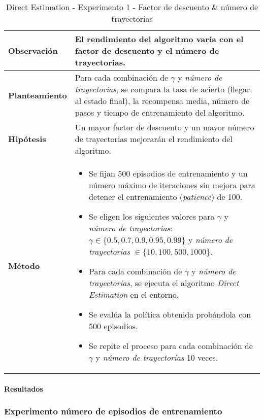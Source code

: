 \begin{table}[H]
    \centering
    \begin{tabularx}{\textwidth}{|p{4cm}|X|} %
        \hline %
        \textbf{Observación} & El rendimiento del algoritmo varía con el factor de descuento y el número de trayectorias.
        \\ \hline
        \textbf{Planteamiento} & Para cada combinación de \(\gamma\) y \textit{número de trayectorias}, se compara la tasa de acierto (llegar al estado final), la recompensa media, número de pasos y tiempo de entrenamiento del algoritmo.
        \\ \hline
        \textbf{Hipótesis} & Un mayor factor de descuento y un mayor número de trayectorias mejorarán el rendimiento del algoritmo.
        \\ \hline
        \textbf{Método} & 
        \begin{itemize}
            \item Se fijan 500 episodios de entrenamiento y un número máximo de iteraciones sin mejora para detener el entrenamiento (\textit{patience}) de 100.
            \item Se eligen los siguientes valores para \(\gamma\) y \textit{número de trayectorias}: \(\gamma \in \{0.5, 0.7, 0.9, 0.95, 0.99\}\) y \textit{número de trayectorias} \(\in \{10, 100, 500, 1000\}\).
            \item Para cada combinación de \(\gamma\) y \textit{número de trayectorias}, se ejecuta el algoritmo \textit{Direct Estimation} en el entorno.
            \item Se evalúa la política obtenida probándola con 500 episodios.
            \item Se repite el proceso para cada combinación de \(\gamma\) y \textit{número de trayectorias} 10 veces.
        \end{itemize}
        \\ \hline
    \end{tabularx}
    \caption{Direct Estimation - Experimento 1 - Factor de descuento \& número de trayectorias}
    \label{tab:diseñoDirectEstimationExp1}
\end{table}

\paragraph{Resultados}

\subsubsection{Experimento número de episodios de entrenamiento}

